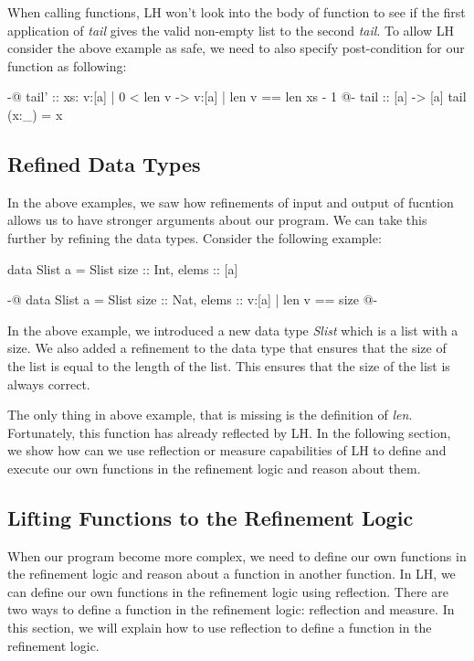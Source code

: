 \documentclass[]{rptuseminar}
\begin{document}
When calling functions, LH won't look into the body of function to see if the first application of \textit{tail} gives the valid non-empty list to the second \textit{tail}.
To allow LH consider the above example as safe, we need to also specify post-condition for our function as following:

\begin{haskell}
 {-@ tail' :: xs: {v:[a] | 0 < len v} -> {v:[a] | len v == len xs - 1} @-}
 tail :: [a] -> [a]
 tail (x:_) = x
\end{haskell}
\subsection{Refined Data Types}
In the above examples, we saw how refinements of input and output of fucntion allows us to have stronger arguments about our program. 
We can take this further by refining the data types. Consider the following example:

\begin{haskell}
  data Slist a = Slist { size :: Int, elems :: [a] }

  {-@ data Slist a = Slist { size :: Nat, elems :: {v:[a] | len v == size} } @-}
\end{haskell}

In the above example, we introduced a new data type \textit{Slist} which is a list with a size. 
We also added a refinement to the data type that ensures that the size of the list is equal to the length of the list. 
This ensures that the size of the list is always correct.

The only thing in above example, that is missing is the definition of \textit{len}. Fortunately, this function has already reflected by
LH. In the following section, we show how can we use reflection or measure capabilities of LH to define and execute our own functions in the refinement logic and
reason about them.

\subsection{Lifting Functions to the Refinement Logic}
When our program become more complex, we need to define our own functions in the refinement logic and reason about
a function in another function. In LH, we can define our own functions in the refinement logic using reflection.
There are two ways to define a function in the refinement logic: reflection and measure. In this section, we will explain how to use reflection to define a function in the refinement logic.
\begin{haskell}

\end{haskell}
\end{document}
